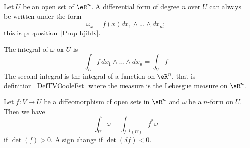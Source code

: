 Let \( U\) be an open set of \( \eR^n\). A differential form of degree \( n\) over \( U\) can always be written under the form
\begin{equation}
	\omega_x=f(x)dx_1\wedge\ldots\wedge dx_n;
\end{equation}
this is proposition~\ref{ProprbjihK}.

\begin{definition}      \label{DEFooEYRFooRQTmRF}
	The integral of \( \omega\) on \( U\) is
	\begin{equation}
		\int_{U}f\,dx_1\wedge\ldots\wedge dx_n=\int_Uf
	\end{equation}
	The second integral is the integral of a function on \( \eR^n\), that is definition~\ref{DefTVOooleEst} where the measure is the Lebesgue measure on \( \eR^n\).
\end{definition}

\begin{lemma}       \label{LEMooNCYSooXtnCKq}
	Let \( f\colon V\to U\) be a diffeomorphism of open sets in \( \eR^n\) and \( \omega\) be a \( n\)-form on \( U\). Then we have
	\begin{equation}
		\int_U\omega=\int_{f^{-1}(U)}f^*\omega
	\end{equation}
	if \( \det(f)>0\). A sign change if \( \det(df)<0\).
\end{lemma}

